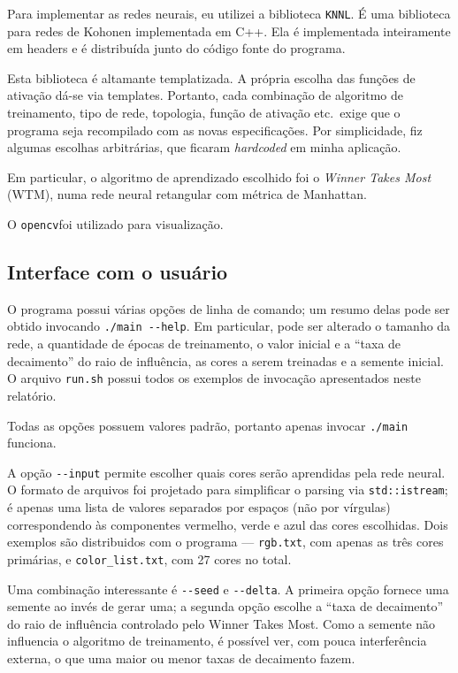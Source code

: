 \documentclass{article}
\newcommand{\KNNL}{{\lstinline"KNNL"}}
\newcommand{\opencv}{{\lstinline"opencv"}}
\begin{document}
Para implementar as redes neurais, eu utilizei a biblioteca \KNNL.
É uma biblioteca para redes de Kohonen implementada em C++.
Ela é implementada inteiramente em headers
e é distribuída junto do código fonte do programa.

Esta biblioteca é altamante templatizada.
A própria escolha das funções de ativação dá-se via templates.
Portanto, cada combinação de algoritmo de treinamento,
tipo de rede, topologia, função de ativação etc.\ exige
que o programa seja recompilado com as novas especificações.
Por simplicidade,
fiz algumas escolhas arbitrárias,
que ficaram \emph{hardcoded} em minha aplicação.

Em particular, o algoritmo de aprendizado escolhido foi o
\emph{Winner Takes Most} (WTM),
numa rede neural retangular com métrica de Manhattan.

O \opencv foi utilizado para visualização.

\subsection{Interface com o usuário}

O programa possui várias opções de linha de comando;
um resumo delas pode ser obtido invocando \lstinline"./main --help".
Em particular, pode ser alterado
o tamanho da rede,
a quantidade de épocas de treinamento,
o valor inicial e a ``taxa de decaimento'' do raio de influência,
as cores a serem treinadas
e a semente inicial.
O arquivo \lstinline"run.sh" possui todos os exemplos de invocação
apresentados neste relatório.

Todas as opções possuem valores padrão,
portanto apenas invocar \lstinline"./main" funciona.

A opção \lstinline"--input" permite escolher quais cores
serão aprendidas pela rede neural.
O formato de arquivos foi projetado
para simplificar o parsing via \lstinline"std::istream";
é apenas uma lista de valores separados por espaços
(não por vírgulas)
correspondendo às componentes vermelho, verde e azul das cores escolhidas.
Dois exemplos são distribuidos com o programa
--- \lstinline"rgb.txt", com apenas as três cores primárias,
e \lstinline"color_list.txt", com 27 cores no total.

Uma combinação interessante é \lstinline"--seed" e \lstinline"--delta".
A primeira opção fornece uma semente ao invés de gerar uma;
a segunda opção escolhe a ``taxa de decaimento''
do raio de influência controlado pelo Winner Takes Most.
Como a semente não influencia o algoritmo de treinamento,
é possível ver, com pouca interferência externa,
o que uma maior ou menor taxas de decaimento fazem.
\end{document}
